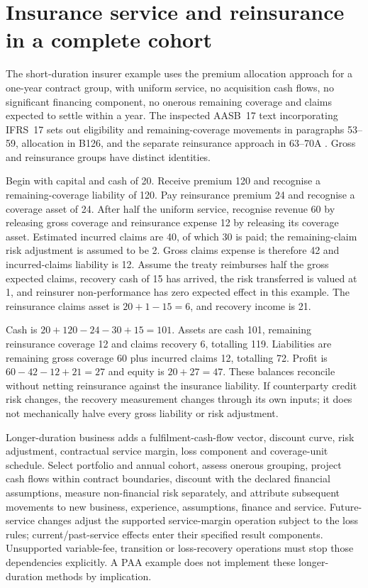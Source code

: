 \section{Insurance service and reinsurance in a complete cohort}

The short-duration insurer example uses the premium allocation approach for
a one-year contract group, with uniform service, no acquisition cash flows,
no significant financing component, no onerous remaining coverage and claims
expected to settle within a year. The inspected AASB~17 text incorporating
IFRS~17 sets out eligibility and remaining-coverage movements in paragraphs
53--59, allocation in B126, and the separate reinsurance approach in
63--70A \citep{aasb17}. Gross and reinsurance groups have distinct identities.

Begin with capital and cash of 20. Receive premium 120 and recognise a
remaining-coverage liability of 120. Pay reinsurance premium 24 and recognise
a coverage asset of 24. After half the uniform service, recognise revenue 60
by releasing gross coverage and reinsurance expense 12 by releasing its
coverage asset. Estimated incurred claims are 40, of which 30 is paid;
the remaining-claim risk adjustment is assumed to be 2. Gross claims expense
is therefore 42 and incurred-claims liability is 12. Assume the treaty
reimburses half the gross expected claims, recovery cash of 15 has arrived,
the risk transferred is valued at 1, and reinsurer non-performance has zero
expected effect in this example. The reinsurance claims asset is
$20+1-15=6$, and recovery income is 21.

Cash is $20+120-24-30+15=101$. Assets are cash 101, remaining reinsurance
coverage 12 and claims recovery 6, totalling 119. Liabilities are remaining
gross coverage 60 plus incurred claims 12, totalling 72. Profit is
$60-42-12+21=27$ and equity is $20+27=47$. These balances reconcile without
netting reinsurance against the insurance liability. If counterparty credit
risk changes, the recovery measurement changes through its own inputs; it
does not mechanically halve every gross liability or risk adjustment.

Longer-duration business adds a fulfilment-cash-flow vector, discount curve,
risk adjustment, contractual service margin, loss component and coverage-unit
schedule. Select portfolio and annual cohort, assess onerous grouping, project
cash flows within contract boundaries, discount with the declared financial
assumptions, measure non-financial risk separately, and attribute subsequent
movements to new business, experience, assumptions, finance and service.
Future-service changes adjust the supported service-margin operation subject
to the loss rules; current/past-service effects enter their specified result
components. Unsupported variable-fee, transition or loss-recovery operations
must stop those dependencies explicitly. A PAA example does not implement
these longer-duration methods by implication.

